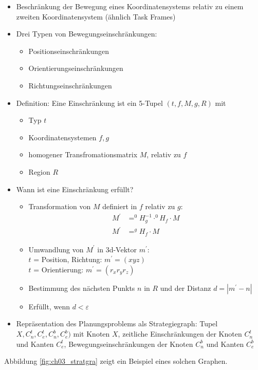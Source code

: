 \begin{itemize}
\item Beschränkung der Bewegung eines Koordinatensystems relativ zu einem zweiten Koordinatensystem (ähnlich \Gu Task Frames\Go) 
\item Drei Typen von Bewegungseinschränkungen:
\begin{itemize}
\item Positionseinschränkungen
\item Orientierungseinschränkungen
\item Richtungseinschränkungen
\end{itemize}
\item Definition: Eine Einschränkung ist ein 5-Tupel $(t, f, M, g, R)$ mit
\begin{itemize}
\item Typ $t$
\item Koordinatensystemen $f, g$
\item homogener Transfromationsmatrix $M$, relativ zu $f$
\item Region $R$
\end{itemize}
\item Wann ist eine Einschränkung erfüllt?
\begin{itemize}
\item Transformation von $M$ definiert in $f$ relativ zu $g$:
\begin{align*}
M^\prime &= ^0H_g^{-1} \cdot ^0 H_f \cdot M\\
M^\prime &= ^g H_f \cdot M
\end{align*}
\item Umwandlung von $M^\prime$ in 3d-Vektor $m^\prime$:\\
$t$ = Position, Richtung: $m^\prime = (x y z)$\\
$t$ = Orientierung: $m^\prime = (r_x r_y r_z )$
\item Bestimmung des nächsten Punkts $n$ in $R$ und der Distanz $d = | m^\prime - n |$
\item Erfüllt, wenn $d < \varepsilon$
\end{itemize}
\item Repräsentation des Planungsproblems als \Gu Strategiegraph\Go :
Tupel $X, C^t_n, C^t_e, C^b_n, C^b_e)$ mit Knoten $X$, zeitliche Einschränkungen der Knoten $C^t_n$ und Kanten $C^t_e$,
Bewegungseinschränkungen der Knoten $C^b_n$ und Kanten $C^b_e$
\end{itemize}
Abbildung \ref{fig:ch03_stratgra} zeigt ein Beispiel eines solchen Graphen.

